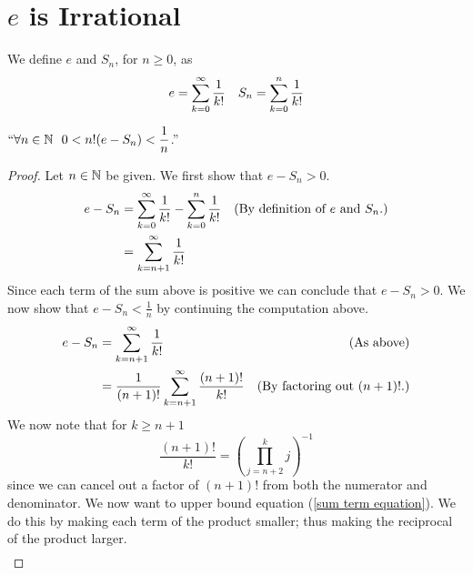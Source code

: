     \section{$e$ is Irrational}
        \begin{definition}
            We define $e$ and $S_n$, for $n \ge 0$, as
            \begin{align*}
                e = \displaystyle\sum_{k = 0}^{\infty} \frac{1}{k!}
                & & S_n = \displaystyle\sum_{k = 0}^{n} \frac{1}{k!}
            \end{align*}
        \end{definition}
        \begin{lemma}
            \label{e is Irrational Lemma}
            $``\forall n \in \mathbb{N} \ \ 0 < n! (e - S_n) < \dfrac{1}{n}$.''
        \end{lemma}
        \begin{proof}
            Let $n \in \mathbb{N}$ be given. We first show that $e - S_n > 0$.
            \begin{align*}
                e - S_n &= \sum_{k = 0}^{\infty} \frac{1}{k!} - \sum_{k = 0}^{n} \frac{1}{k!}
                        & (\mbox{By definition of $e$ and $S_n$.}) \\
                        &= \sum_{k = n + 1}^{\infty} \frac{1}{k!} \\
            \end{align*}
            Since each term of the sum above is positive we can conclude that $e - S_n > 0$.
            We now show that $e - S_n < \frac{1}{n}$ by continuing the computation above.
            \begin{align*}
                e - S_n &= \sum_{k = n + 1}^{\infty} \frac{1}{k!} & (\mbox{As above}) \\
                        &= \frac{1}{(n + 1)!} \sum_{k = n + 1}^{\infty} \frac{(n + 1)!}{k!}
                        & (\mbox{By factoring out $(n + 1)!$.}) \\
            \end{align*}
            We now note that for $k \ge n + 1$
            \begin{equation}
                \label{sum term equation}
                \frac{(n + 1)!}{k!} = \left(\prod_{j = n + 2}^{k} j\right)^{-1}
            \end{equation}
            since we can cancel out a factor of $(n + 1)!$ from both the numerator and
            denominator. We now want to upper bound equation
            (\ref{sum term equation}). We do this by making each term of the product
            smaller; thus making the reciprocal of the product larger.
            \begin{align*}

\end{align*}
\end{proof}

